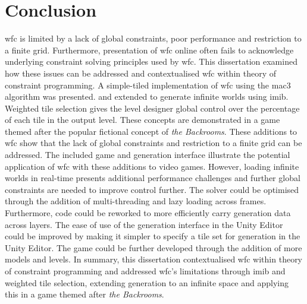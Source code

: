 \chapter{Conclusion}

\acrfull{wfc} is limited by a lack of global constraints, poor performance and restriction to a finite grid. Furthermore, presentation of \acrshort{wfc} online often fails to acknowledge underlying constraint solving principles used by \acrshort{wfc}. This dissertation examined how these issues can be addressed and contextualised \acrshort{wfc} within theory of constraint programming.
A simple-tiled implementation of \acrshort{wfc} using the \acrfull{mac3} algorithm was presented. and extended to generate infinite worlds using \acrfull{imib}. Weighted tile selection gives the level designer global control over the percentage of each tile in the output level. These concepts are demonstrated in a game themed after the popular fictional concept of \textit{the Backrooms}. These additions to \acrshort{wfc} show that the lack of global constraints and restriction to a finite grid can be addressed. The included game and generation interface illustrate the potential application of \acrshort{wfc} with these additions to video games.
However, loading infinite worlds in real-time presents additional performance challenges and further global constraints are needed to improve control further. The solver could be optimised through the addition of multi-threading and lazy loading across frames. Furthermore, code could be reworked to more efficiently carry generation data across layers. The ease of use of the generation interface in the Unity Editor could be improved by making it simpler to specify a tile set for generation in the Unity Editor. The game could be further developed through the addition of more models and levels.
In summary, this dissertation contextualised \acrshort{wfc} within theory of constraint programming and addressed \acrshort{wfc}'s limitations through \acrshort{imib} and weighted tile selection, extending generation to an infinite space and applying this in a game themed after \textit{the Backrooms}.



